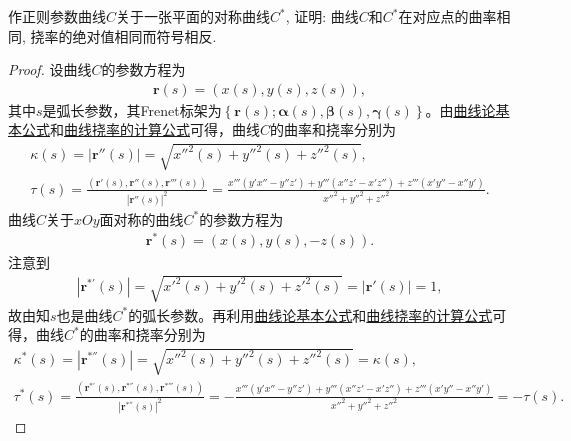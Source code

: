 \documentclass[../../main.tex]{subfiles}%
\begin{document}
\begin{example}
作正则参数曲线$C$关于一张平面的对称曲线$C^*$, 证明: 曲线$C$和$C^*$在对应点的曲率相同, 挠率的绝对值相同而符号相反.
\end{example}
\begin{proof}

设曲线$C$的参数方程为
\begin{align*}
\bm{r}(s) = \left( x(s), y(s), z(s) \right),
\end{align*}
其中$s$是弧长参数，其Frenet标架为$\left\{ \bm{r}(s); \bm{\alpha}(s), \bm{\beta}(s), \bm{\gamma}(s) \right\}$。由\hyperref[theorem:曲线论基本公式]{曲线论基本公式}和\hyperref[theorem:微分几何-曲线挠率的计算公式]{曲线挠率的计算公式}可得，曲线$C$的曲率和挠率分别为
\begin{gather*}
\kappa(s) = \left| \bm{r}''(s) \right| = \sqrt{x''^2(s) + y''^2(s) + z''^2(s)}, \\
\tau(s) = \frac{\left( \bm{r}'(s), \bm{r}''(s), \bm{r}'''(s) \right)}{\left| \bm{r}''(s) \right|^2} = \frac{x''' \left( y'x'' - y''z' \right) + y''' \left( x''z' - x'z'' \right) + z''' \left( x'y'' - x''y' \right)}{x''^2 + y''^2 + z''^2}.
\end{gather*}
曲线$C$关于$xOy$面对称的曲线$C^*$的参数方程为
\begin{align*}
\bm{r}^*(s) = \left( x(s), y(s), -z(s) \right).
\end{align*}
注意到
\begin{align*}
\left| \bm{r}^{*'}(s) \right| = \sqrt{x'^2(s) + y'^2(s) + z'^2(s)} = \left| \bm{r}'(s) \right| = 1,
\end{align*}
故由知$s$也是曲线$C^*$的弧长参数。再利用\hyperref[theorem:曲线论基本公式]{曲线论基本公式}和\hyperref[theorem:微分几何-曲线挠率的计算公式]{曲线挠率的计算公式}可得，曲线$C^*$的曲率和挠率分别为
\begin{gather*}
\kappa^*(s) = \left| \bm{r}^{*''}(s) \right| = \sqrt{x''^2(s) + y''^2(s) + z''^2(s)} = \kappa(s), \\
\tau^*(s) = \frac{\left( \bm{r}^{*'}(s), \bm{r}^{*''}(s), \bm{r}^{*'''}(s) \right)}{\left| \bm{r}^{*''}(s) \right|^2} = -\frac{x''' \left( y'x'' - y''z' \right) + y''' \left( x''z' - x'z'' \right) + z''' \left( x'y'' - x''y' \right)}{x''^2 + y''^2 + z''^2} = -\tau(s).
\end{gather*}

\end{proof}
\end{document}
